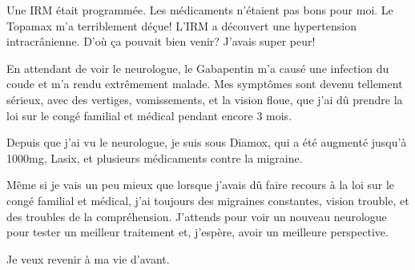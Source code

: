 {Une IRM était programmée. Les médicaments n'étaient pas bons pour moi. Le
Topamax m'a terriblement déçue! L'IRM a découvert une hypertension
intracrânienne. D'où ça pouvait bien venir? J'avais super peur!

En attendant de voir le neurologue, le Gabapentin m'a causé une infection du
coude et m'a rendu extrêmement malade. Mes symptômes sont devenu tellement
sérieux, avec des vertiges, vomissements, et la vision floue, que j'ai dû
prendre la loi sur le congé familial et médical pendant encore 3 mois.

Depuis que j'ai vu le neurologue, je suis sous Diamox, qui a été augmenté
jusqu'à 1000mg, Lasix, et plusieurs médicaments contre la migraine.

Même si je vais un peu mieux que lorsque j'avais dû faire recours à la loi sur
le congé familial et médical, j'ai toujours des migraines constantes, vision
trouble, et des troubles de la compréhension. J'attends pour voir un nouveau
neurologue pour tester un meilleur traitement et, j'espère, avoir un meilleure
perspective.

Je veux revenir à ma vie d'avant.

}
